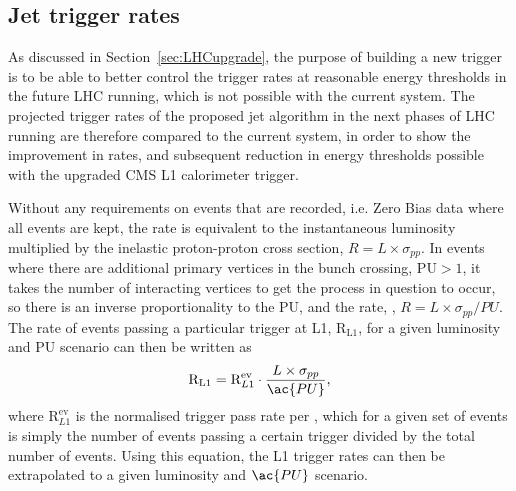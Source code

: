 \subsection{Jet trigger rates}
As discussed in Section~\ref{sec:LHCupgrade}, the purpose of building a new trigger is to be able to better 
control the trigger rates at reasonable energy thresholds in the future \ac{LHC} running, which is not possible with the current system. 
The projected trigger rates of the proposed jet algorithm in the next phases of \ac{LHC} running are therefore compared to the current system, in order to show the improvement in rates, and subsequent reduction in energy thresholds possible with the upgraded \ac{CMS} \ac{L1} calorimeter trigger.

Without any requirements on events that are recorded, i.e. Zero Bias data where all events are kept, the rate is 
equivalent to the instantaneous luminosity multiplied by the inelastic proton-proton cross section, $R = L\times \sigma_{pp}$. 
In events where there are additional primary vertices in the bunch crossing, \ac{PU}$>1$, it takes the number of interacting vertices to get the process in question to occur, so there is an inverse proportionality to the \ac{PU}, and the rate, , $R = L\times \sigma_{pp}/PU$.
The rate of events passing a particular trigger at \ac{L1}, $\text{R}_{\text{L1}}$, for a given luminosity and \ac{PU} scenario can then be written as
%
\begin{equation}
\text{R}_{\rm L1} = \text{R}^{\text{ev}}_{L1} \cdot \frac{L\times \sigma_{pp}}{\ac{PU}},
\end{equation}
%
where $\text{R}^{\text{ev}}_{L1}$ is the normalised trigger pass rate per , which for a given set of events is simply the number of events passing a certain trigger divided by the total number of events.
%
Using this equation, the \ac{L1} trigger rates can then be extrapolated to a given luminosity and $\ac{PU}$ scenario.


